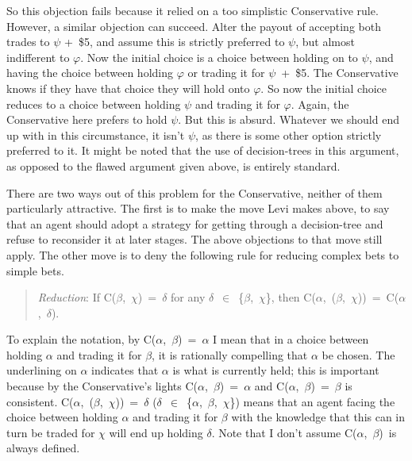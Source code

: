 So this objection fails because it relied on a too simplistic
Conservative rule. However, a similar objection can succeed. Alter the
payout of accepting both trades to $\psi$ +~\$5, and assume this is strictly
preferred to $\psi$, but almost indifferent to $\varphi$. Now the initial choice is a
choice between holding on to $\psi$, and having the choice between holding $\varphi$
or trading it for $\psi$~+~\$5. The Conservative knows if they have that
choice they will hold onto $\varphi$. So now the initial choice reduces to a
choice between holding $\psi$ and trading it for $\varphi$. Again, the Conservative
here prefers to hold $\psi$. But this is absurd. Whatever we should end up
with in this circumstance, it isn't $\psi$, as there is some other option
strictly preferred to it. It might be noted that the use of
decision-trees in this argument, as opposed to the flawed argument given
above, is entirely standard.

There are two ways out of this problem for the Conservative, neither of
them particularly attractive. The first is to make the move Levi makes
above, to say that an agent should adopt a strategy for getting through
a decision-tree and refuse to reconsider it at later stages. The above
objections to that move still apply. The other move is to deny the
following rule for reducing complex bets to simple bets.

\begin{quote}
\emph{Reduction}: If C(\emph{$\beta$},~$\chi$)~=~$\delta$ for any $\delta$~$\in$~\{$\beta$,~$\chi$\}, then
C(\emph{$\alpha$},~(\emph{$\beta$},~$\chi$))~=~C(\emph{$\alpha$},~$\delta$).
\end{quote}

To explain the notation, by C(\emph{$\alpha$},~$\beta$)~=~$\alpha$ I mean that in a choice
between holding $\alpha$ and trading it for $\beta$, it is rationally compelling that
$\alpha$ be chosen. The underlining on $\alpha$ indicates that $\alpha$ is what is currently
held; this is important because by the Conservative's lights
C(\emph{$\alpha$},~$\beta$)~=~$\alpha$ and C($\alpha$,~\emph{$\beta$})~=~$\beta$ is consistent.
C(\emph{$\alpha$},~(\emph{$\beta$},~$\chi$))~=~$\delta$ ($\delta$~$\in$~\{$\alpha$,~$\beta$,~$\chi$\}) means that an agent
facing the choice between holding $\alpha$ and trading it for $\beta$ with the
knowledge that this can in turn be traded for $\chi$ will end up holding $\delta$.
Note that I don't assume C(\emph{$\alpha$},~$\beta$)~is always defined.

